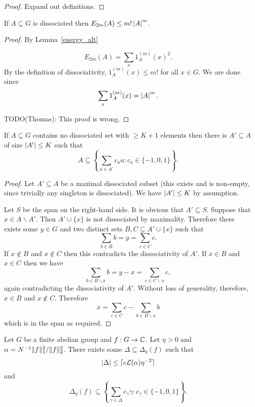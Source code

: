 \begin{proof}
Expand out definitions.
\end{proof}


\begin{lemma}
\label{diss_energy}
If $A\subseteq G$ is dissociated then $E_{2m}(A) \leq m! \left\lvert A\right\rvert^m$.
\end{lemma}
\begin{proof}
By Lemma~\ref{energy_alt}

\[E_{2m}(A) = \sum_x 1_A^{(m)}(x)^2.\]
By the definition of dissociativity, $1_A^{(m)}(x)\leq m!$ for all $x\in G$. We are done since
\[ \sum_x 1_A^{(m)}(x) = \left\lvert A\right\rvert^m.\]

TODO(Thomas): This proof is wrong.
\end{proof}


\begin{lemma}
\label{diss_span}
\leanok
If $A\subseteq G$ contains no dissociated set with $\geq K+1$ elements then there is $A'\subseteq A$ of size $\left\lvert A'\right\rvert\leq K$ such that
\[A\subseteq \left\{ \sum_{a\in A'}c_aa : c_a\in \{-1,0,1\} \right\}.\]
\end{lemma}

\begin{proof}
\leanok
Let $A'\subseteq A$ be a maximal dissociated subset (this exists and is non-empty, since trivially any singleton is dissociated). We have $\left\lvert A'\right\rvert\leq K$ by assumption.

Let $S$ be the span on the right-hand side. It is obvious that $A'\subseteq S$. Suppose that $x\in A\backslash A'$. Then $A'\cup\{x\}$ is not dissociated by maximality. Therefore there exists some $y\in G$ and two distinct sets $B,C\subseteq A'\cup \{x\}$ such that
\[\sum_{b\in B}b = y = \sum_{c\in C} c.\]
If $x\not\in B$ and $x\not\in C$ then this contradicts the dissociativity of $A'$. If $x\in B$ and $x\in C$ then we have
\[\sum_{b\in B\backslash x}b=y-x=\sum_{c\in C\backslash x}c,\]
again contradicting the dissociativity of $A'$. Without loss of generality, therefore, $x\in B$ and $x\not\in C$. Therefore
\[x=\sum_{c\in C}c - \sum_{b\in B\backslash x}b\]
which is in the span as required.
\end{proof}


\begin{theorem}
\label{chang}
Let $G$ be a finite abelian group and $f:G\to \mathbb{C}$. Let $\eta >0$ and $\alpha=N^{-1}\lVert f\rVert_1^2/\lVert f\rVert_2^2$. There exists some $\Delta\subseteq \Delta_\eta(f)$ such that
\[\left\lvert \Delta\right\rvert\leq \lceil e\mathcal{L}(\alpha)\eta^{-2}\rceil \]
and
\[\Delta_\eta(f)\subseteq \left\{ \sum_{\gamma\in\Delta}c_\gamma \gamma : c_\gamma\in \{-1,0,1\} \right\}.\]
\end{theorem}

